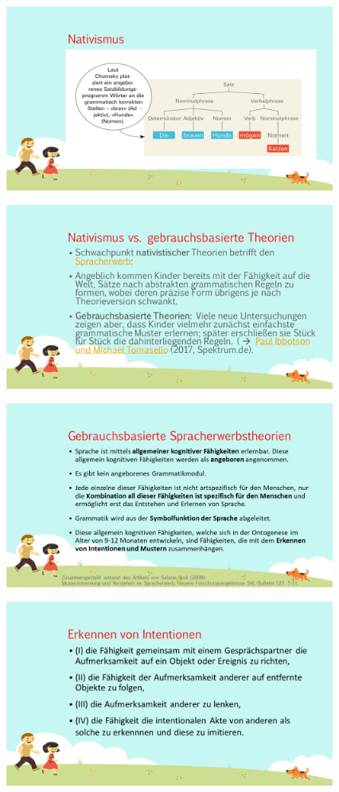\documentclass[
  letterpaper,
]{scrbook}
\begin{document}
\includegraphics[width=4.27in,height=\textheight]{./pictures/muster_intentionen/Diapozitiv3.PNG}

\includegraphics[width=4.27in,height=\textheight]{./pictures/muster_intentionen/Diapozitiv4.PNG}

\includegraphics[width=4.27in,height=\textheight]{./pictures/muster_intentionen/Diapozitiv5.PNG}

\includegraphics[width=4.27in,height=\textheight]{./pictures/muster_intentionen/Diapozitiv6.PNG}
\end{document}
